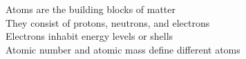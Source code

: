 \documentclass[preview]{standalone}
\begin{document}
Atoms are the building blocks of matter\\They consist of protons, neutrons, and electrons\\Electrons inhabit energy levels or shells\\Atomic number and atomic mass define different atoms\\
\end{document}
